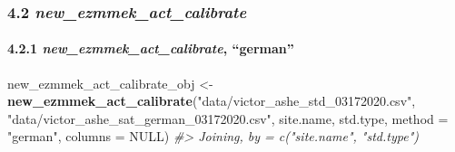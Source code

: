 \documentclass[
]{article}
\newenvironment{Shaded}{\begin{snugshade}}{\end{snugshade}}
\newcommand{\CommentTok}[1]{\textcolor[rgb]{0.56,0.35,0.01}{\textit{#1}}}
\newcommand{\DataTypeTok}[1]{\textcolor[rgb]{0.13,0.29,0.53}{#1}}
\newcommand{\KeywordTok}[1]{\textcolor[rgb]{0.13,0.29,0.53}{\textbf{#1}}}
\newcommand{\NormalTok}[1]{#1}
\newcommand{\OtherTok}[1]{\textcolor[rgb]{0.56,0.35,0.01}{#1}}
\newcommand{\StringTok}[1]{\textcolor[rgb]{0.31,0.60,0.02}{#1}}
\begin{document}
\hypertarget{new_ezmmek_act_calibrate}{%
\subsubsection{\texorpdfstring{4.2
\emph{new\_ezmmek\_act\_calibrate}}{4.2 new\_ezmmek\_act\_calibrate}}\label{new_ezmmek_act_calibrate}}

\hypertarget{new_ezmmek_act_calibrate-german}{%
\paragraph{\texorpdfstring{4.2.1 \emph{new\_ezmmek\_act\_calibrate},
``german''}{4.2.1 new\_ezmmek\_act\_calibrate, ``german''}}\label{new_ezmmek_act_calibrate-german}}

\begin{Shaded}
\begin{Highlighting}[]
\NormalTok{new\_ezmmek\_act\_calibrate\_obj <{-}}\StringTok{ }\KeywordTok{new\_ezmmek\_act\_calibrate}\NormalTok{(}\StringTok{"data/victor\_ashe\_std\_03172020.csv"}\NormalTok{,}
                                                 \StringTok{"data/victor\_ashe\_sat\_german\_03172020.csv"}\NormalTok{,}
\NormalTok{                                                 site.name,}
\NormalTok{                                                 std.type,}
                                                 \DataTypeTok{method =} \StringTok{"german"}\NormalTok{,}
                                                 \DataTypeTok{columns =} \OtherTok{NULL}\NormalTok{)}
\CommentTok{\#> Joining, by = c("site.name", "std.type")}


\end{Highlighting}
\end{Shaded}
\end{document}
